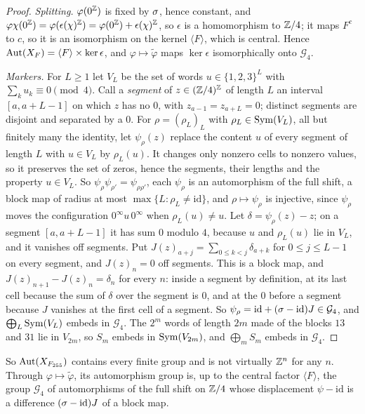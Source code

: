 \begin{proof}
\emph{Splitting.} $\varphi(0^{\mathbb{Z}})$ is fixed by $\sigma$, hence constant, and $\varphi\chi(0^{\mathbb{Z}})=\varphi(\epsilon(\chi)^{\mathbb{Z}})=\varphi(0^{\mathbb{Z}})+\epsilon(\chi)^{\mathbb{Z}}$, so $\epsilon$ is a homomorphism to $\mathbb{Z}/4$; it maps $F^c$ to $c$, so it is an isomorphism on the kernel $\langle F\rangle$, which is central. Hence $\operatorname{Aut}(X_F)=\langle F\rangle\times\ker\epsilon$, and $\varphi\mapsto\tilde\varphi$ maps $\ker\epsilon$ isomorphically onto $\mathcal G_4$.

\emph{Markers.} For $L\ge1$ let $V_L$ be the set of words $u\in\{1,2,3\}^L$ with $\sum_ku_k\equiv0\pmod4$. Call a \emph{segment} of $z\in(\mathbb{Z}/4)^{\mathbb{Z}}$ of length $L$ an interval $[a,a+L-1]$ on which $z$ has no $0$, with $z_{a-1}=z_{a+L}=0$; distinct segments are disjoint and separated by a $0$. For $\rho=(\rho_L)_L$ with $\rho_L\in\operatorname{Sym}(V_L)$, all but finitely many the identity, let $\psi_\rho(z)$ replace the content $u$ of every segment of length $L$ with $u\in V_L$ by $\rho_L(u)$. It changes only nonzero cells to nonzero values, so it preserves the set of zeros, hence the segments, their lengths and the property $u\in V_L$. So $\psi_\rho\psi_{\rho'}=\psi_{\rho\rho'}$, each $\psi_\rho$ is an automorphism of the full shift, a block map of radius at most $\max\{L:\rho_L\ne\mathrm{id}\}$, and $\rho\mapsto\psi_\rho$ is injective, since $\psi_\rho$ moves the configuration $0^{\infty}u\,0^{\infty}$ when $\rho_L(u)\ne u$. Let $\delta=\psi_\rho(z)-z$; on a segment $[a,a+L-1]$ it has sum $0$ modulo $4$, because $u$ and $\rho_L(u)$ lie in $V_L$, and it vanishes off segments. Put $J(z)_{a+j}=\sum_{0\le k<j}\delta_{a+k}$ for $0\le j\le L-1$ on every segment, and $J(z)_n=0$ off segments. This is a block map, and $J(z)_{n+1}-J(z)_n=\delta_n$ for every $n$: inside a segment by definition, at its last cell because the sum of $\delta$ over the segment is $0$, and at the $0$ before a segment because $J$ vanishes at the first cell of a segment. So $\psi_\rho=\mathrm{id}+(\sigma-\mathrm{id})J\in\mathcal G_4$, and $\bigoplus_L\operatorname{Sym}(V_L)$ embeds in $\mathcal G_4$. The $2^m$ words of length $2m$ made of the blocks $13$ and $31$ lie in $V_{2m}$, so $S_m$ embeds in $\operatorname{Sym}(V_{2m})$, and $\bigoplus_mS_m$ embeds in $\mathcal G_4$.
\end{proof}

So $\operatorname{Aut}(X_{F_{255}})$ contains every finite group and is not virtually $\mathbb{Z}^n$ for any $n$. Through $\varphi\mapsto\tilde\varphi$, its automorphism group is, up to the central factor $\langle F\rangle$, the group $\mathcal G_4$ of automorphisms of the full shift on $\mathbb{Z}/4$ whose displacement $\psi-\mathrm{id}$ is a difference $(\sigma-\mathrm{id})J$ of a block map.
